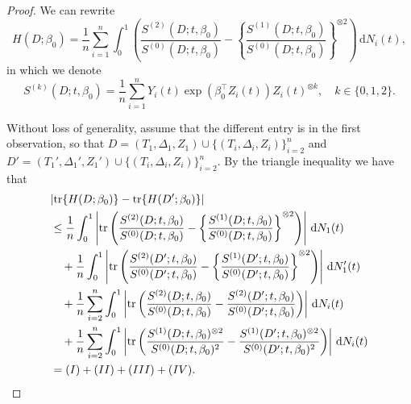 \documentclass[10pt,a4paper]{amsart}
\newcommand{\dint}{\,\mathrm{d}}
\begin{document}
\begin{proof}
    We can rewrite  
\begin{equation*}
 H(D; \beta_0)  = \frac{1}{n} \sum_{i=1}^n \int_0^1 \left(\frac{S^{(2)}(D; t, \beta_0)}{{S}^{(0)}(D; t, \beta_0)} - \left\{ \frac{S^{(1)}(D; t, \beta_0)}{S^{(0)}(D; t, \beta_0)} \right\}^{\otimes 2}\right)  \dint N_i(t),
\end{equation*}
in which we denote
\begin{equation*}
    S^{(k)}(D; t, \beta_0) = \frac{1}{n}\sum_{i=1}^n Y_i(t) \exp(\beta_0^\top Z_i(t)) Z_i(t) ^{\otimes k}, \quad k \in \{0, 1, 2\}.
\end{equation*}

Without loss of generality, assume that the different entry is in the first observation, so that $D=(T_1, \Delta_1, Z_1) \cup \{(T_i, \Delta_i, Z_i)\}_{i=2}^n$ and $D'=(T_1', \Delta_1', Z_1') \cup \{(T_i, \Delta_i, Z_i)\}_{i=2}^n$. By the triangle inequality we have that 
\begin{align}
    &|\mathrm{tr}\{H(D; \beta_0)\} - \mathrm{tr}\{H(D'; \beta_0)\}| \notag\\
    &\leq \frac{1}{n} \int_0^1 \left| \mathrm{tr} \left(\frac{S^{(2)}(D; t, \beta_0)}{S^{(0)}(D; t, \beta_0)} - \left\{ \frac{S^{(1)}(D; t, \beta_0)}{S^{(0)}(D; t, \beta_0)} \right\}^{\otimes 2} \right) \right| \dint N_1(t)  \notag\\
    &\quad + \frac{1}{n}  \int_0^1 \left| \mathrm{tr} \left(\frac{S^{(2)}(D'; t, \beta_0)}{S^{(0)}(D'; t, \beta_0)} - \left\{ \frac{S^{(1)}(D'; t, \beta_0)}{S^{(0)}(D'; t, \beta_0)} \right\}^{\otimes 2} \right) \right|\dint N_1'(t) \notag \\ 
    &\quad + \frac{1}{n} \sum_{i=2}^n \int_0^1  \left| \mathrm{tr} \left(\frac{S^{(2)}(D; t, \beta_0)}{S^{(0)}(D; t, \beta_0)}  - \frac{S^{(2)}(D'; t, \beta_0)}{S^{(0)}(D'; t, \beta_0)} \right)\right| \dint N_i(t) \notag\\
    &\quad + \frac{1}{n} \sum_{i=2}^n \int_0^1 \left| \mathrm{tr} \left(\frac{S^{(1)}(D; t, \beta_0)^{\otimes 2}}{S^{(0)}(D; t, \beta_0)^2} - \frac{S^{(1)}(D'; t, \beta_0)^{\otimes 2}}{S^{(0)}(D'; t, \beta_0)^2} \right)\right| \dint N_i(t) \notag\\ 
    &= (I) + (II) + (III) + (IV).     \label{eq:trace_sensitivity_triangle}
\end{align}


\end{proof}
\end{document}
